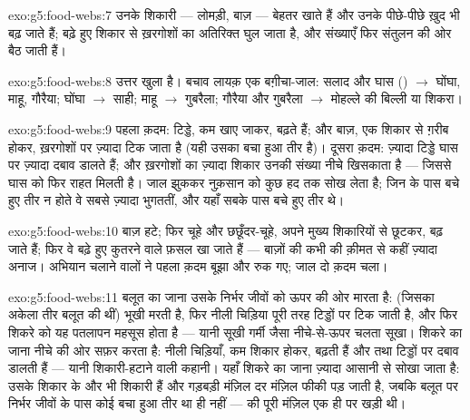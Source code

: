 \begin{solution}{exo:g5:food-webs:7}
उनके शिकारी --- लोमड़ी, बाज़ --- बेहतर खाते हैं और उनके पीछे-पीछे ख़ुद
भी बढ़ जाते हैं; बढ़े हुए शिकार से ख़रगोशों का अतिरिक्त घुल जाता है, और
संख्याएँ फिर संतुलन की ओर बैठ जाती हैं।
\end{solution}

\begin{solution}{exo:g5:food-webs:8}
उत्तर खुला है। बचाव लायक़ एक बग़ीचा-जाल: सलाद और घास
() $\rightarrow$ घोंघा, माहू, गौरैया;
घोंघा $\rightarrow$ साही; माहू $\rightarrow$ गुबरैला;
गौरैया और गुबरैला $\rightarrow$ मोहल्ले की बिल्ली या
शिकरा।
\end{solution}

\begin{solution}{exo:g5:food-webs:9}
पहला क़दम: टिड्डे, कम खाए जाकर, बढ़ते हैं; और बाज़, एक शिकार से ग़रीब
होकर, ख़रगोशों पर ज़्यादा टिक जाता है (यही उसका बचा हुआ तीर है)। दूसरा
क़दम: ज़्यादा टिड्डे घास पर ज़्यादा दबाव डालते हैं; और ख़रगोशों का
ज़्यादा शिकार उनकी संख्या नीचे खिसकाता है --- जिससे घास को फिर राहत
मिलती है। जाल झुककर नुक़सान को कुछ हद तक सोख लेता है; जिन  के
पास बचे हुए तीर न होते वे सबसे ज़्यादा भुगततीं, और यहाँ सबके पास बचे
हुए तीर थे।
\end{solution}

\begin{solution}{exo:g5:food-webs:10}
बाज़ हटे; फिर चूहे और छछूँदर-चूहे, अपने मुख्य शिकारियों से छूटकर, बढ़
जाते हैं; फिर वे बढ़े हुए कुतरने वाले फ़सल खा जाते हैं --- बाज़ों की
कभी की क़ीमत से कहीं ज़्यादा अनाज। अभियान चलाने वालों ने पहला क़दम बूझा
और रुक गए; जाल दो क़दम चला।
\end{solution}

\begin{solution}{exo:g5:food-webs:11}
बलूत का जाना उसके निर्भर जीवों को ऊपर की ओर मारता है:  (जिसका
अकेला तीर बलूत की  थीं) भूखी मरती है, फिर नीली चिड़िया पूरी तरह
टिड्डों पर टिक जाती है, और फिर शिकरे को यह पतलापन महसूस होता है ---
यानी सूखी गर्मी जैसा नीचे-से-ऊपर चलता सूखा। शिकरे का जाना नीचे की ओर
सफ़र करता है: नीली चिड़ियाँ, कम शिकार होकर, बढ़ती हैं और  तथा
टिड्डों पर दबाव डालती हैं --- यानी शिकारी-हटाने वाली कहानी। यहाँ शिकरे
का जाना ज़्यादा आसानी से सोखा जाता है: उसके शिकार के और भी शिकारी हैं
और गड़बड़ी मंज़िल दर मंज़िल फीकी पड़ जाती है, जबकि बलूत पर निर्भर जीवों
के पास कोई बचा हुआ तीर था ही नहीं ---  की पूरी मंज़िल एक ही
 पर खड़ी थी।
\end{solution}
